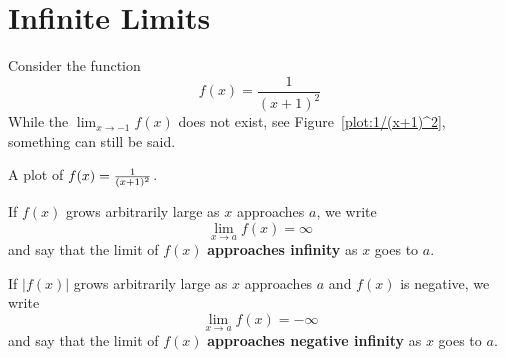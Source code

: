 

\section{Infinite Limits}


Consider the function
\[
f(x) = \frac{1}{(x+1)^2}
\]
While the $\lim_{x\to -1} f(x)$ does not exist, see
Figure~\ref{plot:1/(x+1)^2}, something can still be said.
\begin{marginfigure}
\caption{A plot of $f(x)=\protect\frac{1}{(x+1)^2}$.}
\label{plot:1/(x+1)^2}
\end{marginfigure}


\begin{definition}\label{def:inflimit}
If $f(x)$ grows arbitrarily large as $x$ approaches $a$, we write
\[
\lim_{x\to a} f(x) = \infty
\]
and say that the limit of $f(x)$ \textbf{approaches infinity} as $x$
goes to $a$.

If $|f(x)|$ grows arbitrarily large as $x$ approaches $a$ and $f(x)$ is
negative, we write
\[
\lim_{x\to a} f(x) = -\infty
\]
and say that the limit of $f(x)$ \textbf{approaches negative infinity}
as $x$ goes to $a$.
\end{definition}

